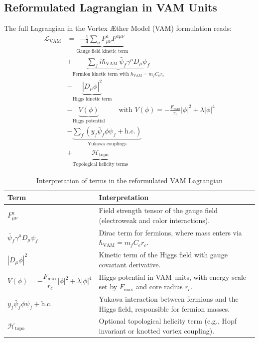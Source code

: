 \subsection*{Reformulated Lagrangian in VAM Units}
The full Lagrangian in the Vortex Æther Model (VAM) formulation reads:
\begin{align*}
    \mathcal{L}_\text{VAM} &=
    \underbrace{-\frac{1}{4} \sum_{a} F^{a}_{\mu\nu} F^{a\mu\nu}}_{\text{Gauge field kinetic term}} \\
    &+ \underbrace{\sum_{f} i \hbar_\text{VAM} \, \bar{\psi}_f \gamma^\mu D_\mu \psi_f}_{\text{Fermion kinetic term with } \hbar_\text{VAM} = m_f C_e r_c} \\
    &- \underbrace{\left| D_\mu \phi \right|^2}_{\text{Higgs kinetic term}} \\
    &- \underbrace{V(\phi)}_{\text{Higgs potential}}
    \qquad \text{with } V(\phi) = -\frac{F_\text{max}}{r_c}|\phi|^2 + \lambda |\phi|^4 \\
    &- \underbrace{\sum_f \left(y_f \bar{\psi}_f \phi \psi_f + \text{h.c.}\right)}_{\text{Yukawa couplings}} \\
    &+ \underbrace{\mathcal{H}_\text{topo}}_{\text{Topological helicity terms}}
\end{align*}

\begin{table}[H]
    \centering
    \caption{Interpretation of terms in the reformulated VAM Lagrangian}
    \label{tab:lagrangian_terms_vam}
    \begin{tabular}{|l|p{10cm}|}
        \hline
        \textbf{Term} & \textbf{Interpretation} \\
        \hline
        $F_{\mu\nu}^a$ & Field strength tensor of the gauge field (electroweak and color interactions). \\
        \hline
        $\bar{\psi}_f \gamma^\mu D_\mu \psi_f$ & Dirac term for fermions, where mass enters via $\hbar_\text{VAM} = m_f C_e r_c$. \\
        \hline
        $|D_\mu \phi|^2$ & Kinetic term of the Higgs field with gauge covariant derivative. \\
        \hline
        $V(\phi) = -\dfrac{F_\text{max}}{r_c}|\phi|^2 + \lambda|\phi|^4$ & Higgs potential in VAM units, with energy scale set by $F_\text{max}$ and core radius $r_c$. \\
        \hline
        $y_f \bar{\psi}_f \phi \psi_f + \text{h.c.}$ & Yukawa interaction between fermions and the Higgs field, responsible for fermion masses. \\
        \hline
        $\mathcal{H}_\text{topo}$ & Optional topological helicity term (e.g., Hopf invariant or knotted vortex coupling). \\
        \hline
    \end{tabular}
\end{table}


